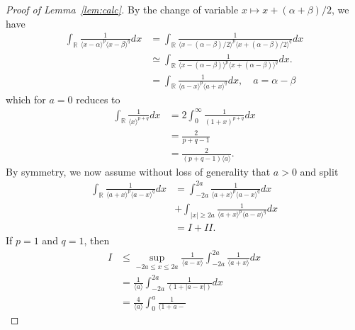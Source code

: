 \documentclass[12pt,reqno]{amsart}
\numberwithin{equation}{section}  %
\numberwithin{figure}{section}
\newcommand{\rr}{\mathbb{R}}
\begin{document}
\begin{proof}[Proof of Lemma~\ref{lem:calc}]
%
By the change of variable $x \mapsto x + (\alpha + \beta)/2$, we have
%
%
\begin{equation}
  \label{rry}
	\begin{split}
    \int_{\rr} \frac{1}{\langle x - \alpha \rangle^{p} \langle  x -
    \beta
    \rangle^{q}}d x
    & = \int_{\rr} \frac{1}{\langle x - (\alpha - \beta)/2  \rangle^{p}
    \langle  x + (\alpha - \beta)/2 \rangle^{q}} d x
    \\
    & \simeq \int_{\rr} \frac{1}{\langle x - (\alpha - \beta)  \rangle^{p}
    \langle  x + (\alpha - \beta) \rangle^{q}} d x.
  \\
  & = \int_{\rr} \frac{1}{\langle a - x \rangle ^{p} \langle a + x \rangle
  ^{q}} d x, \quad a = \alpha - \beta
\end{split}
\end{equation}
%
which for $a =0$ reduces to 
%
%
\begin{equation*}
\begin{split}
  \int_{\rr} \frac{1}{\langle x \rangle ^{p+q}} d x 
  & = 2 \int_{0}^{\infty} \frac{1}{(1 + x)^{p+q}} d x
  \\
  & = \frac{2}{p+q -1}
  \\
  & = \frac{2}{(p+q -1)\langle a \rangle}.
\end{split}
\end{equation*}
%
%
By symmetry, we now assume without loss of generality that $a > 0$ and split 
%
%
\begin{equation*}
\begin{split}
\int_{\rr} \frac{1}{\langle a + x \rangle ^{p} \langle a - x \rangle
  ^{q}} d x
  & = \int_{-2a}^{2a}
  \frac{1}{\langle a + x \rangle ^{p} \langle a - x \rangle
  ^{q}} d x
  \\
  & + \int_{| x | \ge 2a} 
\frac{1}{\langle a + x \rangle ^{p} \langle a - x \rangle
  ^{q}} d x
  \\
  & = I + II.
\end{split}
\end{equation*}
%
%
If $p=1$ and $q=1$, then 
%
%
\begin{equation*}
\begin{split}
  I
  & \le \sup_{-2a \le x \le 2a} \frac{1}{\langle a - x \rangle
} \int_{-2a}^{2a} \frac{1}{\langle a + x \rangle} d x
  \\
  & = \frac{1}{\langle a \rangle} \int_{-2a}^{2a} \frac{1}{(1 + | a -
  x
  |)} d x
  \\
  & = \frac{4}{\langle a \rangle} \int_{0}^{a} \frac{1}{(1 + a -
}
\end{split}
\end{equation*}
\end{proof}
\end{document}
